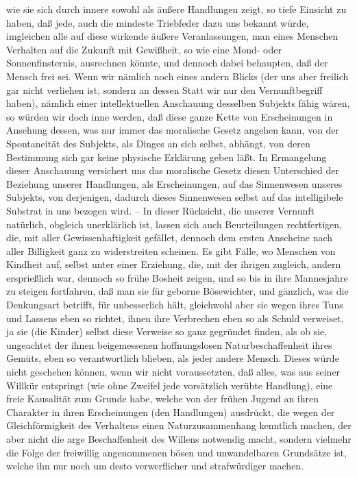\documentclass[a4paper,12pt,twoside]{book}
\begin{document}
wie sie sich durch innere sowohl als äußere Handlungen zeigt, so tiefe Einsicht zu haben, daß jede, auch die mindeste Triebfeder dazu uns bekannt würde, imgleichen alle auf diese wirkende äußere Veranlassungen, man eines Menschen Verhalten auf die Zukunft mit Gewißheit, so wie eine Mond- oder Sonnenfinsternis, ausrechnen könnte, und dennoch dabei behaupten, daß der Mensch frei sei. Wenn wir nämlich noch eines andern Blicks (der uns aber freilich gar nicht verliehen ist, sondern an dessen Statt wir nur den Vernunftbegriff haben), nämlich einer intellektuellen Anschauung desselben Subjekts fähig wären, so würden wir doch inne werden, daß diese ganze Kette von Erscheinungen in Ansehung dessen, was nur immer das moralische Gesetz angehen kann, von der Spontaneität des Subjekts, als Dinges an sich selbst, abhängt, von deren Bestimmung sich gar keine physische Erklärung geben läßt. In Ermangelung dieser Anschauung versichert uns das moralische Gesetz diesen Unterschied der Beziehung unserer Handlungen, als Erscheinungen, auf das Sinnenwesen unseres Subjekts, von derjenigen, dadurch dieses Sinnenwesen selbst auf das intelligibele Substrat in uns bezogen wird. – In dieser Rücksicht, die unserer Vernunft natürlich, obgleich unerklärlich ist, lassen sich auch Beurteilungen rechtfertigen, die, mit aller Gewissenhaftigkeit gefället, dennoch dem ersten Anscheine nach aller Billigkeit ganz zu widerstreiten scheinen. Es gibt Fälle, wo Menschen von Kindheit auf, selbst unter einer Erziehung, die, mit der ihrigen zugleich, andern ersprießlich war, dennoch so frühe Bosheit zeigen, und so bis in ihre Mannesjahre zu steigen fortfahren, daß man sie für geborne Bösewichter, und gänzlich, was die Denkungsart betrifft, für unbesserlich hält, gleichwohl aber sie wegen ihres Tuns und Lassens eben so richtet, ihnen ihre Verbrechen eben so als Schuld verweiset, ja sie (die Kinder) selbst diese Verweise so ganz gegründet  finden, als ob sie, ungeachtet der ihnen beigemessenen hoffnungslosen Naturbeschaffenheit ihres Gemüts, eben so verantwortlich blieben, als jeder andere Mensch. Dieses würde nicht geschehen können, wenn wir nicht voraussetzten, daß alles, was aus seiner Willkür entspringt (wie ohne Zweifel jede vorsätzlich verübte Handlung), eine freie Kausalität zum Grunde habe, welche von der frühen Jugend an ihren Charakter in ihren Erscheinungen (den Handlungen) ausdrückt, die wegen der Gleichförmigkeit des Verhaltens einen Naturzusammenhang kenntlich machen, der aber nicht die arge Beschaffenheit des Willens notwendig macht, sondern vielmehr die Folge der freiwillig angenommenen bösen und unwandelbaren Grundsätze ist, welche ihn nur noch um desto verwerflicher und strafwürdiger machen. 
	
\end{document}
